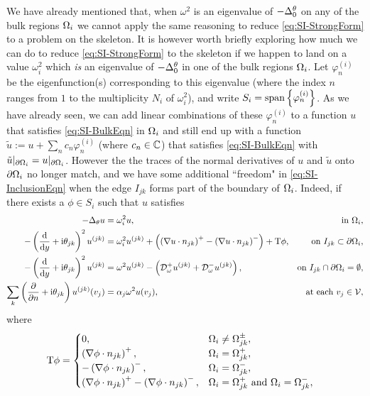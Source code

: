 We have already mentioned that, when $\omega^2$ is an eigenvalue of $-\Delta^\theta_0$ on any of the bulk regions $\Omega_i$ we cannot apply the same reasoning to reduce \eqref{eq:SI-StrongForm} to a problem on the skeleton.
It is however worth briefly exploring how much we can do to reduce \eqref{eq:SI-StrongForm} to the skeleton if we happen to land on a value $\omega_i^2$ which \emph{is} an eigenvalue of $-\Delta^\theta_0$ in one of the bulk regions $\Omega_i$.
Let $\varphi^{(i)}_n$ be the eigenfunction(s) corresponding to this eigenvalue (where the index $n$ ranges from $1$ to the multiplicity $N_i$ of $\omega_i^2$), and write $S_i = \mathrm{span}\left\{ \varphi^{(i)}_n \right\}$.
As we have already seen, we can add linear combinations of these $\varphi^{(i)}_n$ to a function $u$ that satisfies \eqref{eq:SI-BulkEqn} in $\Omega_i$ and still end up with a function $\tilde{u} := u + \sum_{n}c_n\varphi^{(i)}_n$ (where $c_n\in\mathbb{C}$) that satisfies \eqref{eq:SI-BulkEqn} with $\tilde{u}\vert_{\partial\Omega_i} = u\vert_{\partial\Omega_i}$.
However the the traces of the normal derivatives of $u$ and $\tilde{u}$ onto $\partial\Omega_i$ no longer match, and we have some additional ``freedom" in \eqref{eq:SI-InclusionEqn} when the edge $I_{jk}$ forms part of the boundary of $\Omega_i$.
Indeed, if there exists a $\phi\in S_i$ such that $u$ satisfies
\begin{subequations}
	\begin{align*}
		-\Delta_{\theta}u &= \omega_i^2 u, &\text{in } \Omega_i, \\
		-\left( \dfrac{\mathrm{d}}{\mathrm{d}y} + \mathrm{i}\theta_{jk} \right)^2u^{(jk)}  
		&= \omega_i^2 u^{(jk)} + \left( \left( \nabla u\cdot n_{jk} \right)^+ - \left( \nabla u\cdot n_{jk} \right)^- \right) + \mathrm{T}\phi,
		&\text{on } I_{jk}\subset\partial\Omega_i, \\
		- \left( \dfrac{\mathrm{d}}{\mathrm{d}y} + \mathrm{i}\theta_{jk} \right)^2u^{(jk)} 
		&= \omega^2 u^{(jk)} - \left(  \mathcal{D}^+_\omega u^{(jk)} + \mathcal{D}^-_\omega u^{(jk)} \right),
		&\text{on } I_{jk}\cap\partial\Omega_i=\emptyset, \\
		\sum_{k} \left( \dfrac{\partial }{\partial n}+\mathrm{i}\theta_{jk} \right) u^{(jk)}(v_j) 
		&= \alpha_j\omega^2 u(v_j),
		&\text{at each } v_j\in\mathcal{V},
	\end{align*}
\end{subequations}
where
\begin{align*}
	\mathrm{T}\phi &=
	\begin{cases}
		0, & \Omega_i\neq\Omega_{jk}^{\pm}, \\
		\left( \nabla\phi\cdot n_{jk} \right)^+, & \Omega_i = \Omega_{jk}^+, \\
		-\left( \nabla\phi\cdot n_{jk} \right)^-, & \Omega_i = \Omega_{jk}^-, \\
		\left( \nabla\phi\cdot n_{jk} \right)^+ -\left( \nabla\phi\cdot n_{jk} \right)^-, & \Omega_i = \Omega_{jk}^+ \text{ and } \Omega_i = \Omega_{jk}^-,
	\end{cases}
\end{align*}
